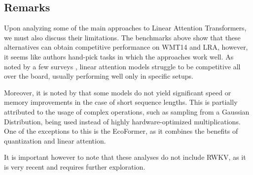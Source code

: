 \subsection{Remarks}

Upon analyzing some of the main approaches to Linear Attention Transformers, we must also discuss their limitations. The benchmarks above show that these alternatives can obtain competitive performance on WMT14 and LRA, however, it seems like authors hand-pick tasks in which the approaches work well. As noted by a few surveys \cite{tay2022efficient}\cite{lin2021survey}, linear attention models struggle to be competitive all over the board, usually performing well only in specific setups. 

Moreover, it is noted by \cite{tay2022efficient} that some models do not yield significant speed or memory improvements in the case of short sequence lengths. This is partially attributed to the usage of complex operations, such as sampling from a Gaussian Distribution, being used instead of highly hardware-optimized multiplications. One of the exceptions to this is the EcoFormer, as it combines the benefits of quantization and linear attention.

It is important however to note that these analyses do not include RWKV, as it is very recent and requires further exploration.
